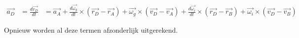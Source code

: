 \begin{equation*}
\begin{split}
\overrightarrow{a_{D}}&=\frac{d\overrightarrow{v_{D}}}{dt}
&=	\overrightarrow{a_{A}} + \frac{d\overrightarrow{\omega_{g}}}{dt}\times(\overrightarrow{r_{D}}-\overrightarrow{r_{A}}) + \overrightarrow{\omega_{g}}\times(\overrightarrow{v_{D}}-\overrightarrow{v_{A}}) + \frac{d\overrightarrow{\omega_i}}{dt}\times(\overrightarrow{r_{D}}-\overrightarrow{r_{B}})+\overrightarrow{\omega_{i}}\times(\overrightarrow{v_{D}}-\overrightarrow{v_{B}})
\end{split}
\end{equation*}

Opnieuw worden al deze termen afzonderlijk uitgerekend.
